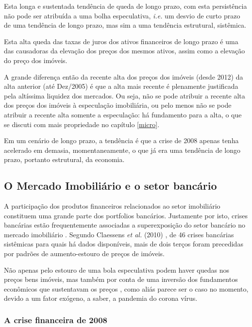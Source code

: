 \documentclass[
	12pt,				%
	oneside,			%
	a4paper,			%
	chapter=TITLE,		%
	section=TITLE,		%
	english,			%
	brazil				%
	]{abntex2}
\begin{document}
Esta longa e sustentada tendência de queda de longo prazo, com esta
persistência não pode ser atribuída a uma bolha especulativa,
\emph{i.e.} um desvio de curto prazo de uma tendência de longo prazo,
mas sim a uma tendência estrutural, sistêmica.

Esta alta queda das taxas de juros dos ativos financeiros de longo prazo
é uma das causadoras da elevação dos preços dos mesmos ativos, assim
como a elevação do preço dos imóveis.

A grande diferença então da recente alta dos preços dos imóveis (desde
2012) da alta anterior (até Dez/2005) é que a alta mais recente é
plenamente justificada pela altíssima liquidez dos mercados. Ou seja,
não se pode atribuir a recente alta dos preços dos imóveis à especulação
imobiliária, ou pelo menos não se pode atribuir a recente alta somente a
especulação: há fundamento para a alta, o que se discuti com mais
propriedade no capítulo \ref{micro}.

Em um cenário de longo prazo, a tendência é que a crise de 2008 apenas
tenha acelerado em demasia, momentaneamente, o que já era uma tendência
de longo prazo, portanto estrutural, da economia.

\subsection{O Mercado Imobiliário e o setor
bancário}\label{MI-e-o-setor-bancario}

A participação dos produtos financeiros relacionados ao setor
imobiliário constituem uma grande parte dos portfolios bancários.
Justamente por isto, crises bancárias estão frequentemente associadas a
superexposição do setor bancário no mercado imobiliário
\autocite[148]{Case2000}. Segundo Claessens \emph{et al.} (2010)
\autocite[apud][3]{silver}, de 46 crises bancárias sistêmicas para quais
há dados disponíveis, mais de dois terços foram precedidas por padrões
de aumento-estouro de preços de imóveis.

Não apenas pelo estouro de uma bola especulativa podem haver quedas nos
preços bens imóveis, mas também por conta de uma inversão dos
fundamentos econômicos que sustentavam os preços
\autocite[129]{Case2000}, como aliás parece ser o caso no momento,
devido a um fator exógeno, a saber, a pandemia do corona vírus.

\subsubsection{A crise financeira de
2008}\label{a-crise-financeira-de-2008}
\end{document}
